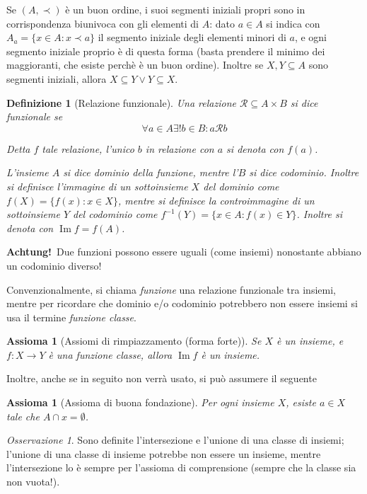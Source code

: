 \documentclass[a4paper,10pt,oneside]{article}
\DeclareMathOperator{\im}{Im}
\newcommand{\myname}[1]{\emph{#1}}
\newcommand{\rel}{\mathcal R}
\theoremstyle{plain}
\newtheorem{mydef}[mytheorem]{Definizione}
\newtheorem{myax}[mytheorem]{Assioma}
\theoremstyle{definition}
\theoremstyle{remark}
\newtheorem*{myobs}{Osservazione}
\begin{document}
Se $(A,\prec)$ è un buon ordine, i suoi segmenti iniziali propri sono in corrispondenza biunivoca con gli elementi di $A$: dato $a\in A$ si indica con $A_{a}=\{x\in A: x\prec a\}$ il segmento iniziale degli elementi minori di $a$, e ogni segmento iniziale proprio è di questa forma (basta prendere il minimo dei maggioranti, che esiste perchè è un buon ordine). Inoltre se $X,Y\subseteq A$ sono segmenti iniziali, allora $X\subseteq Y \vee Y\subseteq X$.

\begin{mydef}[Relazione funzionale]
 Una relazione $\rel \subseteq A\times B$ si dice funzionale se \[\forall a \in A \exists! b \in B: a\rel b\] 
 
 Detta $f$ tale relazione, l'unico $b$ in relazione con $a$ si denota con $f(a)$.
 
 L'insieme $A$ si dice \myname{dominio} della funzione, mentre l'$B$ si dice \myname{codominio}. Inoltre si definisce l'immagine di un sottoinsieme $X$ del dominio come $f(X)=\{f(x):x \in X\}$, mentre si definisce la controimmagine di un sottoinsieme $Y$ del codominio come $f^{-1}(Y)=\{x\in A: f(x)\in Y\}$. Inoltre si denota con $\im f = f(A)$.
\end{mydef}

\textbf{Achtung!}\texttrademark \ Due funzioni possono essere uguali (come insiemi) nonostante abbiano un codominio diverso!\vspace{6px}

Convenzionalmente, si chiama \myname{funzione} una relazione funzionale tra insiemi, mentre per ricordare che dominio e/o codominio potrebbero non essere insiemi si usa il termine \myname{funzione classe}.

\begin{myax}[Assiomi di rimpiazzamento (forma forte)]
 Se $X$ è un insieme, e $f: X \rightarrow Y$ è una funzione classe, allora $\im f$ è un insieme.
\end{myax}

Inoltre, anche se in seguito non verrà usato, si può assumere il seguente
\begin{myax}[Assioma di buona fondazione]
 Per ogni insieme $X$, esiste $a \in X$ tale che $A \cap x = \emptyset$.
\end{myax}

\begin{myobs}
 Sono definite l'intersezione e l'unione di una classe di insiemi; l'unione di una classe di insieme potrebbe non essere un insieme, mentre l'intersezione lo è sempre per l'assioma di comprensione (sempre che la classe sia non vuota!).
\end{myobs}
\end{document}

